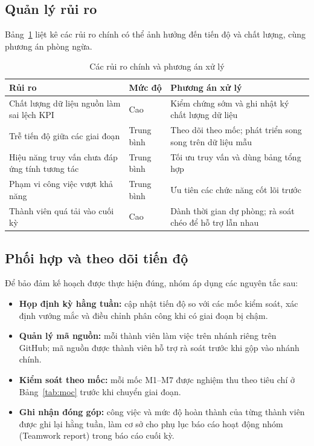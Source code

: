 \subsection{Quản lý rủi ro}
\label{subsec:rui-ro}

Bảng~\ref{tab:rui-ro} liệt kê các rủi ro chính có thể ảnh hưởng đến tiến độ và chất
lượng, cùng phương án phòng ngừa.

\begin{table}[htbp]
    \centering
    \small
    \caption{Các rủi ro chính và phương án xử lý}
    \label{tab:rui-ro}
    \begin{tabularx}{\textwidth}{|>{\raggedright\arraybackslash}p{5.2cm}
                                 |>{\raggedright\arraybackslash}p{2.1cm}
                                 |>{\raggedright\arraybackslash}X|}
        \hline
        \textbf{Rủi ro} & \textbf{Mức độ} & \textbf{Phương án xử lý} \\
        \hline
        Chất lượng dữ liệu nguồn làm sai lệch KPI
            & Cao & Kiểm chứng sớm và ghi nhật ký chất lượng dữ liệu \\
        \hline
        Trễ tiến độ giữa các giai đoạn
            & Trung bình & Theo dõi theo mốc; phát triển song song trên dữ liệu mẫu \\
        \hline
        Hiệu năng truy vấn chưa đáp ứng tính tương tác
            & Trung bình & Tối ưu truy vấn và dùng bảng tổng hợp \\
        \hline
        Phạm vi công việc vượt khả năng
            & Trung bình & Ưu tiên các chức năng cốt lõi trước \\
        \hline
        Thành viên quá tải vào cuối kỳ
            & Cao & Dành thời gian dự phòng; rà soát chéo để hỗ trợ lẫn nhau \\
        \hline
    \end{tabularx}
\end{table}

\subsection{Phối hợp và theo dõi tiến độ}
\label{subsec:phoi-hop}

Để bảo đảm kế hoạch được thực hiện đúng, nhóm áp dụng các nguyên tắc sau:
\begin{itemize}
    \item \textbf{Họp định kỳ hằng tuần:} cập nhật tiến độ so với các mốc kiểm soát,
          xác định vướng mắc và điều chỉnh phân công khi có giai đoạn bị chậm.
    \item \textbf{Quản lý mã nguồn:} mỗi thành viên làm việc trên nhánh riêng trên
          GitHub; mã nguồn được thành viên hỗ trợ rà soát trước khi gộp vào nhánh
          chính.
    \item \textbf{Kiểm soát theo mốc:} mỗi mốc M1--M7 được nghiệm thu theo tiêu chí ở
          Bảng~\ref{tab:moc} trước khi chuyển giai đoạn.
    \item \textbf{Ghi nhận đóng góp:} công việc và mức độ hoàn thành của từng thành
          viên được ghi lại hằng tuần, làm cơ sở cho phụ lục báo cáo hoạt động nhóm
          (Teamwork report) trong báo cáo cuối kỳ.
\end{itemize}